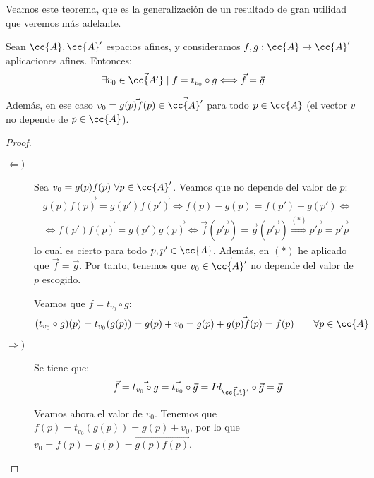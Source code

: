 Veamos este teorema, que es la generalización de un resultado de gran utilidad que veremos más adelante.
\begin{teo}
    Sean $\cc{A},\cc{A}'$ espacios afines, y consideramos $f,g:\cc{A}\to \cc{A}'$ aplicaciones afines. Entonces:
    \begin{equation*}
        \exists v_0\in \vec{\cc{A'}}\mid f=t_{v_0}\circ g \Longleftrightarrow \vec{f}=\vec{g}
    \end{equation*}

    Además, en ese caso $v_0=\vec{g(p)f(p)}\in \vec{\cc{A}'}$ para todo $p\in \cc{A}$ (el vector $v$ no depende de $p\in \cc{A}$).
\end{teo}
\begin{proof}\
    \begin{description}
        \item[$\Longleftarrow)$] Sea $v_0=\vec{g(p)f(p)}~\forall p\in \cc{A}'$. Veamos que no depende del valor de $p$:
        \begin{multline*}
            \vec{g(p)f(p)} = \vec{g(p')f(p')} \Longleftrightarrow f(p)-g(p) = f(p')-g(p') \Longleftrightarrow \\ \Longleftrightarrow \vec{f(p')f(p)} = \vec{g(p')g(p)} \Longleftrightarrow \vec{f}(\vec{p'p}) = \vec{g}(\vec{p'p}) \stackrel{(\ast)}{\Longrightarrow} \vec{p'p} = \vec{p'p}
        \end{multline*}
        lo cual es cierto para todo $p,p'\in \cc{A}$. Además, en $(\ast)$ he aplicado que $\vec{f}=\vec{g}$. Por tanto, tenemos que $v_0\in \vec{\cc{A}'}$ no depende del valor de $p$ escogido.

        Veamos que $f=t_{v_0}\circ g$:
        \begin{equation*}
            (t_{v_0}\circ g)(p) = t_{v_0}(g(p)) = g(p) + v_0 = g(p) + \vec{g(p)f(p)} = f(p) \qquad \forall p\in \cc{A}
        \end{equation*}

        \item[$\Longrightarrow)$] Se tiene que:
        \begin{equation*}
            \vec{f} = \vec{t_{v_0}\circ g} = \vec{t_{v_0}}\circ \vec{g} = Id_{\vec{\cc{A}'}}\circ \vec{g} = \vec{g}
        \end{equation*}

        Veamos ahora el valor de $v_0$. Tenemos que $f(p)=t_{v_0}(g(p)) = g(p)+v_0$, por lo que $v_0=f(p)-g(p)=\vec{g(p)f(p)}$.
    \end{description}
\end{proof}

